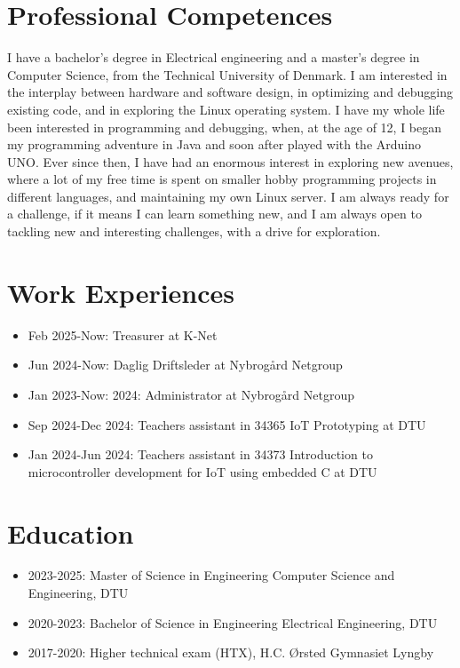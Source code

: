 \section{Professional Competences}
	I have a bachelor's degree in Electrical engineering and a master's degree in Computer Science, from the Technical University of Denmark.
	I am interested in the interplay between hardware and software design, in optimizing and debugging existing code, and in exploring the Linux operating system.
	I have my whole life been interested in programming and debugging, when, at the age of 12, I began my programming adventure in Java and soon after played with the Arduino UNO.
	Ever since then, I have had an enormous interest in exploring new avenues, where a lot of my free time is spent on smaller hobby programming projects in different languages, and maintaining my own Linux server.
	I am always ready for a challenge, if it means I can learn something new, and I am always open to tackling new and interesting challenges, with a drive for exploration.

\section{Work Experiences}
	\begin{itemize}
		\item Feb 2025-Now: Treasurer at K-Net
		\item Jun 2024-Now: Daglig Driftsleder at Nybrogård Netgroup
		\item Jan 2023-Now: 2024: Administrator at Nybrogård Netgroup
		\item Sep 2024-Dec 2024: Teachers assistant in 34365 IoT Prototyping at DTU
		\item Jan 2024-Jun 2024: Teachers assistant in 34373 Introduction to microcontroller development for IoT using embedded C at DTU
	\end{itemize}

\section{Education}
	\begin{itemize}
		\item 2023-2025: Master of Science in Engineering Computer Science and Engineering, DTU
		\item 2020-2023: Bachelor of Science in Engineering Electrical Engineering, DTU
		\item 2017-2020: Higher technical exam (HTX), H.C. Ørsted Gymnasiet Lyngby
	\end{itemize}

